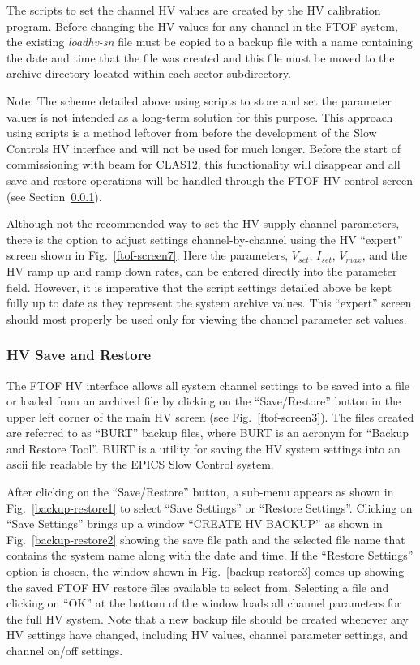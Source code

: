 \documentclass[12pt]{article}
\begin{document}
The scripts to set the channel HV values are created by the HV calibration program. Before changing 
the HV values for any channel in the FTOF system, the existing {\it loadhv-sn} file must be copied to 
a backup file with a name containing the date and time that the file was created and this file must be 
moved to the archive directory located within each sector subdirectory.

Note: The scheme detailed above using scripts to store and set the parameter values is not intended
as a long-term solution for this purpose. This approach using scripts is a method leftover from before 
the development of the Slow Controls HV interface and will not be used for much longer. Before the 
start of commissioning with beam for CLAS12, this functionality will disappear and all save and restore 
operations will be handled through the FTOF HV control screen (see Section~\ref{save-restore}).

Although not the recommended way to set the HV supply channel parameters, there is the option to adjust
settings channel-by-channel using the HV ``expert'' screen shown in Fig.~\ref{ftof-screen7}. Here the 
parameters, $V_{set}$, $I_{set}$, $V_{max}$, and the HV ramp up and ramp down rates, can be entered 
directly into the parameter field. However, it is imperative that the script settings detailed 
above be kept fully up to date as they represent the system archive values. This ``expert'' screen
should most properly be used only for viewing the channel parameter set values.

\subsubsection{HV Save and Restore}
\label{save-restore}

The FTOF HV interface allows all system channel settings to be saved into a file or loaded from an
archived file by clicking on the ``Save/Restore'' button in the upper left corner of the main HV
screen (see Fig.~\ref{ftof-screen3}). The files created are referred to as ``BURT'' backup files,
where BURT is an acronym for ``Backup and Restore Tool''. BURT is a utility for saving the HV system
settings into an ascii file readable by the EPICS Slow Control system.

After clicking on the ``Save/Restore'' button, a sub-menu appears as shown in Fig.~\ref{backup-restore1}
to select ``Save Settings'' or ``Restore Settings''. Clicking on ``Save Settings'' brings up a window
``CREATE HV BACKUP'' as shown in Fig.~\ref{backup-restore2} showing the save file path and the selected
file name that contains the system name along with the date and time. If the ``Restore Settings'' option
is chosen, the window shown in Fig.~\ref{backup-restore3} comes up showing the saved FTOF HV restore
files available to select from. Selecting a file and clicking on ``OK'' at the bottom of the window
loads all channel parameters for the full HV system. Note that a new backup file should be created 
whenever any HV settings have changed, including HV values, channel parameter settings, and channel 
on/off settings.
\end{document}
